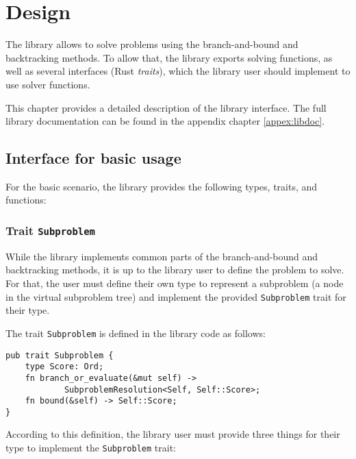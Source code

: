 \chapter{Design}
\label{chap:design}

The library allows to solve problems using the branch-and-bound and backtracking methods.
To allow that, the library exports solving functions, as well as several interfaces
(Rust \emph{traits}), which the library user should implement to use solver functions.

This chapter provides a detailed description of the library interface. The full library
documentation can be found in the appendix chapter \ref{appex:libdoc}.

\section{Interface for basic usage}

\label{sec:basic_usage}

For the basic scenario, the library provides the following types, traits, and functions:

\subsection{Trait \texttt{Subproblem}}

While the library implements common parts of the branch-and-bound and backtracking methods,
it is up to the library user to define the problem to solve. For that, the user must define
their own type to represent a subproblem (a node in the virtual subproblem tree) and implement
the provided \texttt{Subproblem} trait for their type.

The trait \texttt{Subproblem} is defined in the library code as follows:

\begin{lstlisting}[caption=Trait \texttt{Subproblem}]
pub trait Subproblem {
    type Score: Ord;
    fn branch_or_evaluate(&mut self) ->
            SubproblemResolution<Self, Self::Score>;
    fn bound(&self) -> Self::Score;
}
\end{lstlisting}

According to this definition, the library user must provide three things for their type to
implement the \texttt{Subproblem} trait:


